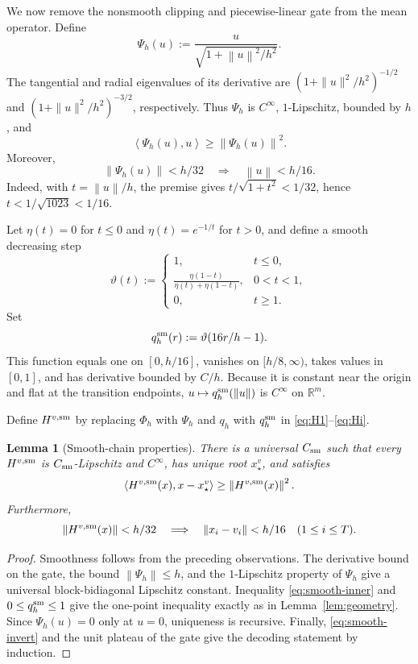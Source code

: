 \documentclass[11pt,a4paper]{article}
\newcommand{\R}{\mathbb R}
\newcommand{\norm}[1]{\left\lVert #1\right\rVert}
\newcommand{\inner}[2]{\left\langle #1,#2\right\rangle}
\newtheorem{lemma}[theorem]{Lemma}
\theoremstyle{definition}
\theoremstyle{remark}
\begin{document}
We now remove the nonsmooth clipping and piecewise-linear gate from the mean operator.  Define
\begin{equation}
 \Psi_h(u):=\frac{u}{\sqrt{1+\norm{u}^2/h^2}}.
 \label{eq:smooth-clip}
\end{equation}
The tangential and radial eigenvalues of its derivative are
$(1+\|u\|^2/h^2)^{-1/2}$ and $(1+\|u\|^2/h^2)^{-3/2}$, respectively.
Thus $\Psi_h$ is $C^\infty$, $1$-Lipschitz, bounded by $h$, and
\begin{equation}
 \inner{\Psi_h(u)}{u}\ge\norm{\Psi_h(u)}^2.
 \label{eq:smooth-inner}
\end{equation}
Moreover,
\begin{equation}
 \norm{\Psi_h(u)}<h/32
 \quad\Longrightarrow\quad
 \norm u<h/16.
 \label{eq:smooth-invert}
\end{equation}
Indeed, with $t=\norm u/h$, the premise gives $t/\sqrt{1+t^2}<1/32$, hence $t<1/\sqrt{1023}<1/16$.

Let $\eta(t)=0$ for $t\le0$ and $\eta(t)=e^{-1/t}$ for $t>0$, and define a smooth decreasing step
\[
 \vartheta(t):=
 \begin{cases}
 1,&t\le0,\\
 \displaystyle\frac{\eta(1-t)}{\eta(t)+\eta(1-t)},&0<t<1,\\
 0,&t\ge1.
 \end{cases}
\]
Set
\begin{equation}
 q_h^{\rm sm}(r):=\vartheta(16r/h-1).
 \label{eq:smooth-gate}
\end{equation}
This function equals one on $[0,h/16]$, vanishes on $[h/8,\infty)$, takes values in $[0,1]$, and has derivative bounded by $C/h$.  Because it is constant near the origin and flat at the transition endpoints, $u\mapsto q_h^{\rm sm}(\norm u)$ is $C^\infty$ on $\R^m$.

Define $H^{v,{\rm sm}}$ by replacing $\Phi_h$ with $\Psi_h$ and $q_h$ with $q_h^{\rm sm}$ in \eqref{eq:H1}--\eqref{eq:Hi}.

\begin{lemma}[Smooth-chain properties]\label{lem:smooth-chain}
There is a universal $C_{\rm sm}$ such that every $H^{v,{\rm sm}}$ is $C_{\rm sm}$-Lipschitz and $C^\infty$, has unique root $x_\star^v$, and satisfies
\[
 \inner{H^{v,{\rm sm}}(x)}{x-x_\star^v}
 \ge\norm{H^{v,{\rm sm}}(x)}^2.
\]
Furthermore,
\[
 \norm{H^{v,{\rm sm}}(x)}<h/32
 \quad\Longrightarrow\quad
 \norm{x_i-v_i}<h/16
 \quad(1\le i\le T).
\]
\end{lemma}

\begin{proof}
Smoothness follows from the preceding observations.  The derivative bound on the gate, the bound $\norm{\Psi_h}\le h$, and the $1$-Lipschitz property of $\Psi_h$ give a universal block-bidiagonal Lipschitz constant.  Inequality \eqref{eq:smooth-inner} and $0\le q_h^{\rm sm}\le1$ give the one-point inequality exactly as in Lemma~\ref{lem:geometry}.  Since $\Psi_h(u)=0$ only at $u=0$, uniqueness is recursive.  Finally, \eqref{eq:smooth-invert} and the unit plateau of the gate give the decoding statement by induction.
\end{proof}
\end{document}
